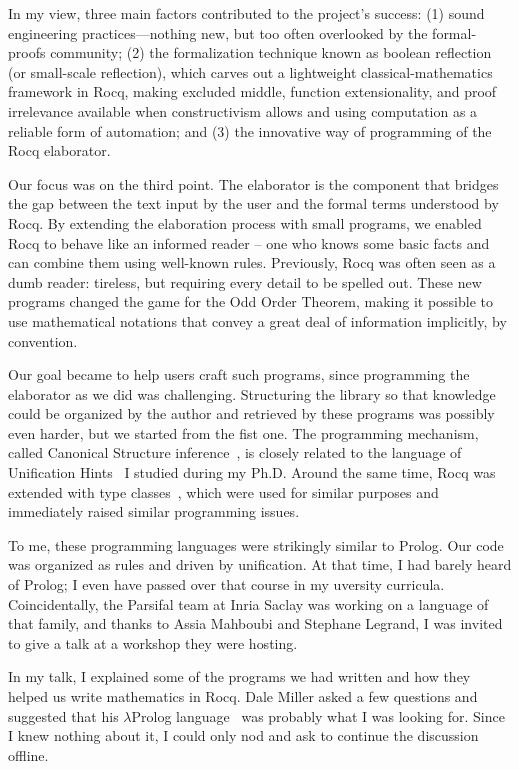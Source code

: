 \documentclass[a4paper, 11pt]{book}
\begin{document}
In my view, three main factors contributed to the project's success: (1) sound
engineering practices—nothing new, but too often overlooked by the formal-proofs
community; (2) the formalization technique known as boolean reflection (or
small-scale reflection), which carves out a lightweight classical-mathematics
framework in Rocq, making excluded middle, function extensionality, and proof
irrelevance available when constructivism allows and using
computation as a reliable form of automation; and (3) the innovative way of
programming of the Rocq elaborator.

Our focus was on the third point. The elaborator is the component that bridges
the gap between the text input by the user and the formal terms understood by
Rocq. By extending the elaboration process with small programs, we enabled Rocq
to behave like an informed reader -- one who knows some basic facts and can
combine them using well-known rules. Previously, Rocq was often seen as a
dumb reader: tireless, but requiring every detail to be spelled out. These
new programs changed the game for the Odd Order Theorem, making it possible to
use mathematical notations that convey a great deal of information implicitly,
by convention. 

Our goal became to help users craft such programs, since
programming the elaborator as we did was challenging. Structuring the library
so that knowledge could be organized by the author and retrieved by these
programs was possibly even harder, but we started from the fist one.
The programming mechanism, called Canonical Structure
inference~\cite{tassi13}, is closely related to the language of Unification
Hints~\cite{asperti09} I studied during my Ph.D. Around the same time, Rocq was
extended with type classes~\cite{fctc}, which were used for similar purposes
and immediately raised similar programming issues.

To me, these programming languages were strikingly similar to Prolog. Our code was organized
as rules and driven by unification. At that time, I had barely heard of Prolog;
I even have passed over that course in my uversity curricula.
Coincidentally, the Parsifal team at Inria Saclay was working on a language of
that family, and thanks to Assia Mahboubi and Stephane Legrand, I was invited
to give a talk at a workshop they were hosting.

In my talk, I explained some of the programs we had written and how they helped
us write mathematics in Rocq. Dale Miller asked a few questions and suggested
that his $\lambda$Prolog language~\cite{10.1093/logcom/1.4.497} was probably
what I was looking for. Since I knew nothing about it, I could only nod and ask
to continue the discussion offline.
\end{document}
